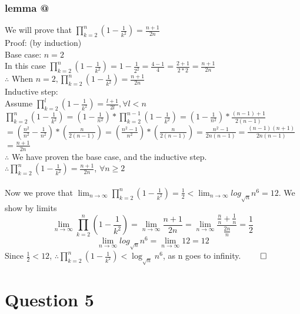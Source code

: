 \documentclass{article}
\begin{document}
          \subsubsection{lemma @}
            We will prove that $\prod_{k=2}^{n}(1 - \frac{1}{k^{2}}) = \frac{n + 1}{2n}$ \\
            Proof: (by induction) \\
            Base case: $n = 2$ \\
            In this case $\prod_{k=2}^{n}(1 - \frac{1}{k^{2}}) = 1 - \frac{1}{2^{2}} = \frac{4 - 1}{4} = \frac{2 + 1}{2*2} = \frac{n + 1}{2n}$ \\
            $\therefore$ When $n = 2, \prod_{k=2}^{n}(1 - \frac{1}{k^{2}}) = \frac{n + 1}{2n}$ \\
            Inductive step: \\
            Assume $\prod_{k=2}^{l}(1 - \frac{1}{k^{2}}) = \frac{l + 1}{2l}, \forall l < n$ \\
            $\prod_{k=2}^{n}(1 - \frac{1}{k^{2}}) = (1 - \frac{1}{n^{2}}) * \prod_{k=2}^{n-1}(1 - \frac{1}{k^{2}}) = (1 - \frac{1}{n^{2}})*\frac{(n - 1) + 1}{2(n - 1)}$ \\
            $= (\frac{n^{2}}{n^{2}} - \frac{1}{n^{2}})*(\frac{n}{2(n-1)}) = (\frac{n^{2} - 1}{n^{2}})*(\frac{n}{2(n - 1)}) = \frac{n^{2} - 1}{2n(n - 1)} = \frac{(n - 1)(n + 1)}{2n(n - 1)}$ \\
            $= \frac{n + 1}{2n}$ \\
            $\therefore$ We have proven the base case, and the inductive step. \\
            $\therefore \prod_{k=2}^{n}(1 - \frac{1}{k^{2}}) = \frac{n + 1}{2n}$, $\forall n \geq 2$ \\
          \\
          Now we prove that $\lim_{n \to \infty}\prod_{k=2}^{n}(1 - \frac{1}{k^{2}}) = \frac{1}{2} < \lim_{n \to \infty}log_{\sqrt{n}}n^{6} = 12$. We show by limits \\
          \[\lim_{n \to \infty}\prod_{k=2}^{n}(1 - \frac{1}{k^{2}}) = \lim_{n \to \infty}\frac{n + 1}{2n} = \lim_{n \to \infty}\frac{\frac{n}{n} + \frac{1}{n}}{\frac{2n}{n}} = \frac{1}{2}\]
      \[\lim_{n \to \infty}log_{\sqrt{n}}n^{6} = \lim_{n \to \infty}12 = 12\]
      Since $\frac{1}{2} < 12$, $\therefore \prod_{k=2}^{n}(1 - \frac{1}{k^{2}}) < \log_{\sqrt{n}}n^{6}$, as n goes to infinity. $\qed$
    \section{Question 5}
\end{document}
